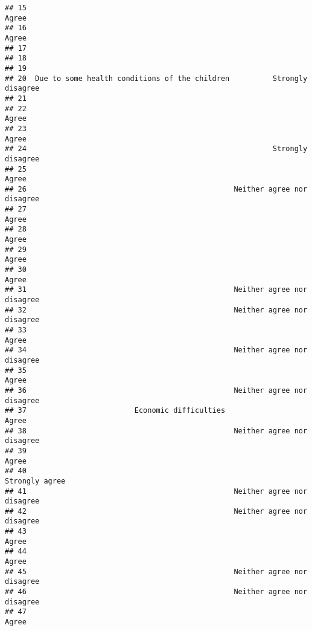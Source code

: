 \documentclass[
]{article}
\begin{document}
\begin{verbatim}
## 15                                                                     Agree
## 16                                                                     Agree
## 17                                                                          
## 18                                                                          
## 19                                                                          
## 20  Due to some health conditions of the children          Strongly disagree
## 21                                                                          
## 22                                                                     Agree
## 23                                                                     Agree
## 24                                                         Strongly disagree
## 25                                                                     Agree
## 26                                                Neither agree nor disagree
## 27                                                                     Agree
## 28                                                                     Agree
## 29                                                                     Agree
## 30                                                                     Agree
## 31                                                Neither agree nor disagree
## 32                                                Neither agree nor disagree
## 33                                                                     Agree
## 34                                                Neither agree nor disagree
## 35                                                                     Agree
## 36                                                Neither agree nor disagree
## 37                         Economic difficulties                       Agree
## 38                                                Neither agree nor disagree
## 39                                                                     Agree
## 40                                                            Strongly agree
## 41                                                Neither agree nor disagree
## 42                                                Neither agree nor disagree
## 43                                                                     Agree
## 44                                                                     Agree
## 45                                                Neither agree nor disagree
## 46                                                Neither agree nor disagree
## 47                                                                     Agree

\end{verbatim}
\end{document}
